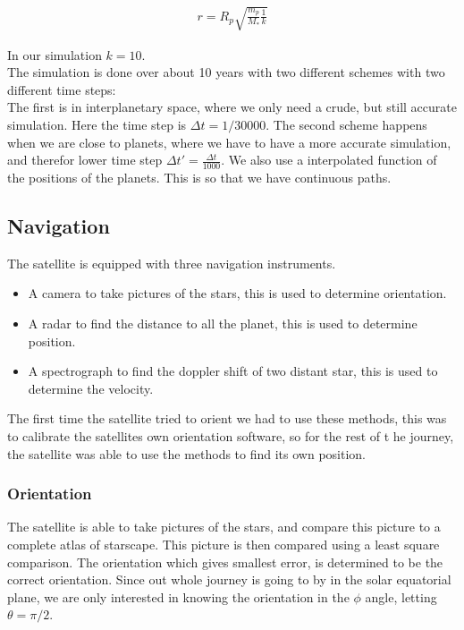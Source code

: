 \documentclass[a4paper, 10pt]{article}
\begin{document}
\begin{align}\label{eq:safeDist}
r = R_p\sqrt{\frac{m_p}{M_*}\frac{1}{k}}
\end{align}

In our simulation $k = 10$. \\

The simulation is done over about 10 years with two different schemes with two different time steps:\\
The first is in interplanetary space, where we only need a crude, but still accurate simulation. Here the time step is $\Delta t = 1/30000$. The second scheme happens when we are close to planets, where we have to have a more accurate simulation, and therefor lower time step $\Delta t' =\frac{\Delta t}{1000}$. We also use a interpolated function of the positions of the planets. This is so that we have continuous paths.


\subsection{Navigation}
The satellite is equipped with three navigation instruments.

\begin{itemize}
\item A camera to take pictures of the stars, this is used to determine orientation.
\item A radar to find the distance to all the planet, this is used to determine position.
\item A spectrograph to find the doppler shift of two distant star, this is used to determine the velocity. 
\end{itemize}

The first time the satellite tried to orient we had to use these methods, this was to calibrate the satellites own orientation software, so for the rest of t he journey, the satellite was able to use the methods to find its own position.

\subsubsection{Orientation}
The satellite is able to take pictures of the stars, and compare this picture to a complete atlas of starscape. This picture is then compared using a least square comparison. The orientation which gives smallest error, is determined to be the correct orientation. Since out whole journey is going to by in the solar equatorial plane, we are only interested in knowing the orientation in the $\phi$ angle, letting $\theta = \pi /2$.\\
\end{document}
